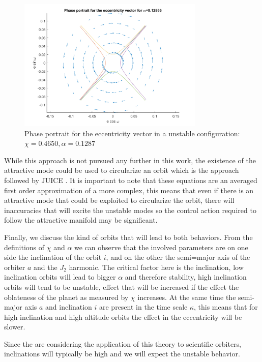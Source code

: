 \begin{figure}[h]
	\centering
	\includegraphics[height=2.5in]
	{figures/Europa200km01e60i/EccentricityPhasePortrait.png}
	\caption{Phase portrait for the eccentricity vector in a unstable configuration: $\chi = 0.4650, \alpha = 0.1287$}
	\label{fig:eccentricityPhasePortraitUnstable}
\end{figure}

While this approach is not pursued any further in this work, the existence of the attractive mode could be used to circularize an orbit which is the approach followed by JUICE \cite{esa2011juice}. It is important to note that these equations are an averaged first order approximation of a more complex, this means that even if there is an attractive mode that could be exploited to circularize the orbit, there will inaccuracies that will excite the unstable modes so the control action required to follow the attractive manifold may be significant.

Finally, we discuss the kind of orbits that will lead to both behaviors. From the definitions of $\chi$ and $\alpha$ we can observe that the involved parameters are on one side the inclination of the orbit $i$, and on the other the semi=major axis of the orbiter $a$ and the $J_2$ harmonic. The critical factor here is the inclination, low inclination orbits will lead to bigger $\alpha$ and therefore stability, high inclination orbits will tend to be unstable, effect that will be increased if the effect the oblateness of the planet as measured by $\chi$ increases. At the same time the semi-major axis $a$ and inclination $i$ are present in the time scale $\kappa$, this means that for high inclination and high altitude orbits the effect in the eccentricity will be slower.

Since the are considering the application of this theory to scientific orbiters, inclinations will typically be high and we will expect the unstable behavior.